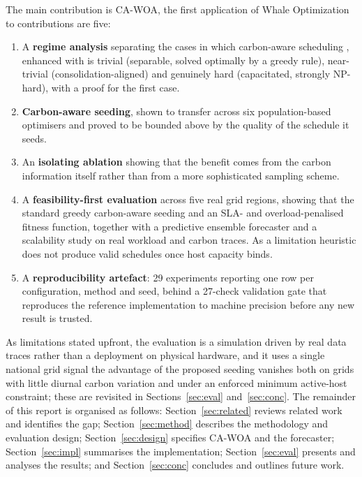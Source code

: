 \documentclass[12pt,a4paper]{article}
\providecommand{\DIFaddtex}[1]{{\protect\color{blue} \sf #1}} %
\providecommand{\DIFdeltex}[1]{{\protect\color{red} \scriptsize #1}} %
\providecommand{\DIFaddbegin}{} %
\providecommand{\DIFaddend}{} %
\providecommand{\DIFdelbegin}{} %
\providecommand{\DIFdelend}{} %
\providecommand{\DIFadd}[1]{\texorpdfstring{\DIFaddtex{#1}}{#1}} %
\providecommand{\DIFdel}[1]{\texorpdfstring{\DIFdeltex{#1}}{}} %
\providecommand{\DIFscaledelfig}{0.5}
\newlength{\DIFdelgraphicswidth} %
\newlength{\DIFdelgraphicsheight} %
\providecommand{\DIFaddincludegraphics}[2][]{{\color{blue}\fbox{\DIFOincludegraphics[#1]{#2}}}} %
\providecommand{\DIFdelincludegraphics}[2][]{%
\sbox{\DIFdelgraphicsbox}{\DIFOincludegraphics[#1]{#2}}%
\settoboxwidth{\DIFdelgraphicswidth}{\DIFdelgraphicsbox} %
\settoboxtotalheight{\DIFdelgraphicsheight}{\DIFdelgraphicsbox} %
\scalebox{\DIFscaledelfig}{%
\parbox[b]{\DIFdelgraphicswidth}{\usebox{\DIFdelgraphicsbox}\\[-\baselineskip] \rule{\DIFdelgraphicswidth}{0em}}\llap{\resizebox{\DIFdelgraphicswidth}{\DIFdelgraphicsheight}{%
\setlength{\unitlength}{\DIFdelgraphicswidth}%
\begin{picture}(1,1)%
\thicklines\linethickness{2pt} %
{\color[rgb]{1,0,0}\put(0,0){\framebox(1,1){}}}%
{\color[rgb]{1,0,0}\put(0,0){\line( 1,1){1}}}%
{\color[rgb]{1,0,0}\put(0,1){\line(1,-1){1}}}%
\end{picture}%
}\hspace*{3pt}}} %
} %
\DeclareRobustCommand{\DIFaddbegin}{\DIFOaddbegin \let\includegraphics\DIFaddincludegraphics} %
\DeclareRobustCommand{\DIFaddend}{\DIFOaddend \let\includegraphics\DIFOincludegraphics} %
\DeclareRobustCommand{\DIFdelbegin}{\DIFOdelbegin \let\includegraphics\DIFdelincludegraphics} %
\DeclareRobustCommand{\DIFdelend}{\DIFOaddend \let\includegraphics\DIFOincludegraphics} %
\begin{document}
The \DIFdelbegin \DIFdel{main contribution is CA-WOA, the first application of Whale Optimization to }\DIFdelend \DIFaddbegin \DIFadd{contributions are five:
}\begin{enumerate}
\item \DIFadd{A \textbf{regime analysis} separating the cases in which }\DIFaddend carbon-aware scheduling \DIFdelbegin \DIFdel{,
enhanced with }\DIFdelend \DIFaddbegin \DIFadd{is trivial (separable,
solved optimally by a greedy rule), near-trivial (consolidation-aligned) and genuinely hard (capacitated,
strongly NP-hard), with a proof for the first case.
}\item \DIFadd{\textbf{Carbon-aware seeding}, shown to transfer across six population-based optimisers and proved to be
bounded above by the quality of the schedule it seeds.
}\item \DIFadd{An \textbf{isolating ablation} showing that the benefit comes from the carbon information itself rather
than from a more sophisticated sampling scheme.
}\item \DIFadd{A \textbf{feasibility-first evaluation} across five real grid regions, showing that the standard greedy
}\DIFaddend carbon-aware \DIFdelbegin \DIFdel{seeding and an SLA- and overload-penalised fitness function,
together with a predictive ensemble forecaster and a scalability study on real workload and
carbon traces.
As a limitation
}\DIFdelend \DIFaddbegin \DIFadd{heuristic does not produce valid schedules once host capacity binds.
}\item \DIFadd{A \textbf{reproducibility artefact}: 29 experiments reporting one row per configuration, method and
seed, behind a 27-check validation gate that reproduces the reference implementation to machine precision
before any new result is trusted.
}\end{enumerate}
\DIFadd{As limitations }\DIFaddend stated upfront, the evaluation is a simulation driven by real \DIFdelbegin \DIFdel{data }\DIFdelend \DIFaddbegin \DIFadd{traces }\DIFaddend rather than a deployment on
physical hardware, and \DIFdelbegin \DIFdel{it uses a single national grid signal}\DIFdelend \DIFaddbegin \DIFadd{the advantage of the proposed seeding vanishes both on grids with little diurnal carbon
variation and under an enforced minimum active-host constraint}\DIFaddend ; these are revisited in
Sections~\ref{sec:eval} and~\ref{sec:conc}. The remainder of this report is organised as follows: Section~\ref{sec:related} reviews
related work and identifies the gap; Section~\ref{sec:method} describes the methodology and evaluation design;
Section~\ref{sec:design} specifies CA-WOA and the forecaster; Section~\ref{sec:impl} summarises the
implementation; Section~\ref{sec:eval} presents and analyses the results; and Section~\ref{sec:conc} concludes
and outlines future work.
\end{document}
